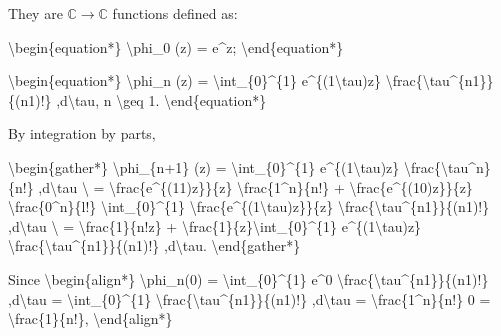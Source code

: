 \documentclass[letterpaper,10pt,english]{jupyterBook}
\begin{document}
\sphinxAtStartPar
They are \(\mathbb{C} \rightarrow \mathbb{C}\) functions defined as:

\sphinxAtStartPar
\textbackslash{}begin\{equation*\}
\textbackslash{}phi\_0 (z) = e\textasciicircum{}z;
\textbackslash{}end\{equation*\}

\sphinxAtStartPar
\textbackslash{}begin\{equation*\}
\textbackslash{}phi\_n (z) = \textbackslash{}int\_\{0\}\textasciicircum{}\{1\} e\textasciicircum{}\{(1\sphinxhyphen{}\textbackslash{}tau)z\} \textbackslash{}frac\{\textbackslash{}tau\textasciicircum{}\{n\sphinxhyphen{}1\}\}\{(n\sphinxhyphen{}1)!\} ,d\textbackslash{}tau, n \textbackslash{}geq 1.
\textbackslash{}end\{equation*\}

\sphinxAtStartPar
By integration by parts,

\sphinxAtStartPar
\textbackslash{}begin\{gather*\}
\textbackslash{}phi\_\{n+1\} (z) = \textbackslash{}int\_\{0\}\textasciicircum{}\{1\} e\textasciicircum{}\{(1\sphinxhyphen{}\textbackslash{}tau)z\} \textbackslash{}frac\{\textbackslash{}tau\textasciicircum{}n\}\{n!\} ,d\textbackslash{}tau \textbackslash{}
= \sphinxhyphen{} \textbackslash{}frac\{e\textasciicircum{}\{(1\sphinxhyphen{}1)z\}\}\{z\} \textbackslash{}frac\{1\textasciicircum{}n\}\{n!\} + \textbackslash{}frac\{e\textasciicircum{}\{(1\sphinxhyphen{}0)z\}\}\{z\} \textbackslash{}frac\{0\textasciicircum{}n\}\{l!\} \sphinxhyphen{} \textbackslash{}int\_\{0\}\textasciicircum{}\{1\} \sphinxhyphen{}\textbackslash{}frac\{e\textasciicircum{}\{(1\sphinxhyphen{}\textbackslash{}tau)z\}\}\{z\} \textbackslash{}frac\{\textbackslash{}tau\textasciicircum{}\{n\sphinxhyphen{}1\}\}\{(n\sphinxhyphen{}1)!\} ,d\textbackslash{}tau \textbackslash{}
= \sphinxhyphen{} \textbackslash{}frac\{1\}\{n!z\} + \textbackslash{}frac\{1\}\{z\}\textbackslash{}int\_\{0\}\textasciicircum{}\{1\} e\textasciicircum{}\{(1\sphinxhyphen{}\textbackslash{}tau)z\} \textbackslash{}frac\{\textbackslash{}tau\textasciicircum{}\{n\sphinxhyphen{}1\}\}\{(n\sphinxhyphen{}1)!\} ,d\textbackslash{}tau.
\textbackslash{}end\{gather*\}

\sphinxAtStartPar
Since
\textbackslash{}begin\{align*\}
\textbackslash{}phi\_n(0) = \textbackslash{}int\_\{0\}\textasciicircum{}\{1\} e\textasciicircum{}0 \textbackslash{}frac\{\textbackslash{}tau\textasciicircum{}\{n\sphinxhyphen{}1\}\}\{(n\sphinxhyphen{}1)!\} ,d\textbackslash{}tau = \textbackslash{}int\_\{0\}\textasciicircum{}\{1\} \textbackslash{}frac\{\textbackslash{}tau\textasciicircum{}\{n\sphinxhyphen{}1\}\}\{(n\sphinxhyphen{}1)!\} ,d\textbackslash{}tau = \textbackslash{}frac\{1\textasciicircum{}n\}\{n!\} \sphinxhyphen{} 0 = \textbackslash{}frac\{1\}\{n!\},
\textbackslash{}end\{align*\}
\end{document}
